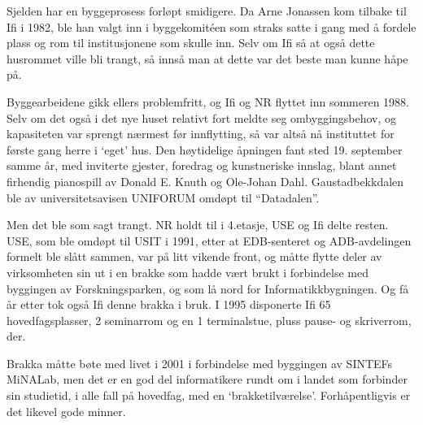 Sjelden har en byggeprosess forløpt smidigere. Da Arne Jonassen kom tilbake til Ifi i 1982, ble han valgt inn i byggekomitéen som straks satte i gang med å fordele plass og rom til institusjonene som skulle inn. Selv om Ifi så at også dette husrommet ville bli trangt, så innså man at dette var det beste man kunne håpe på.

Byggearbeidene gikk ellers problemfritt, og Ifi og NR flyttet inn sommeren 1988. Selv om det også i det nye huset relativt fort meldte seg ombyggingsbehov, og kapasiteten var sprengt nærmest før innflytting, så var altså nå instituttet for første gang herre i `eget' hus. Den høytidelige åpningen fant sted 19. september samme år, med inviterte gjester, foredrag og kunstneriske innslag, blant annet firhendig pianospill av Donald E. Knuth og Ole-Johan Dahl. Gaustadbekkdalen ble av universitetsavisen UNIFORUM omdøpt til ``Datadalen''.

Men det ble som sagt trangt. NR holdt til i 4.etasje, USE og Ifi delte resten. USE, som ble omdøpt til USIT i 1991, etter at EDB-senteret og ADB-avdelingen formelt ble slått sammen, var på litt vikende front, og måtte flytte deler av virksomheten sin ut i en brakke som hadde vært brukt i forbindelse med byggingen av Forskningsparken, og som lå nord for Informatikkbygningen. Og få år etter tok også Ifi denne brakka i bruk. I 1995 disponerte Ifi 65 hovedfagsplasser, 2 seminarrom og en 1 terminalstue, pluss pause- og skriverrom, der. 

Brakka måtte bøte med livet i 2001 i forbindelse med byggingen av SINTEFs MiNALab, men det er en god del informatikere rundt om i landet som forbinder sin studietid, i alle fall på hovedfag, med en `brakketilværelse'. Forhåpentligvis er det likevel gode minner.
